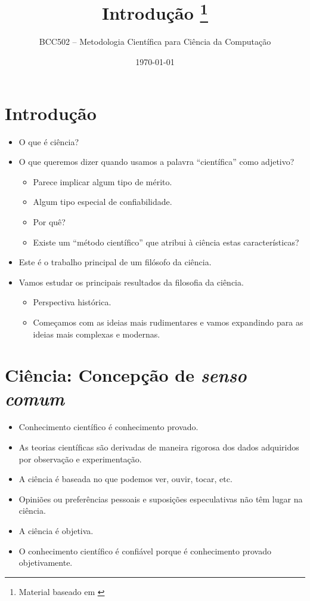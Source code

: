 \documentclass[9pt,a4paper]{extarticle}
\begin{document}
\title{Introdução \footnote{Material baseado em \citep{chalmers1993ciencia}}}
\author{BCC502 -- Metodologia Científica para Ciência da Computação}
\date{\today}
\maketitle

\tableofcontents

\section{Introdução}
\begin{itemize}
    \item O que é ciência?
    \item O que queremos dizer quando usamos a palavra ``científica'' como adjetivo?
    \begin{itemize}
        \item Parece implicar algum tipo de mérito.
        \item Algum tipo especial de confiabilidade.
        \item Por quê?
        \item Existe um ``método científico'' que atribui à ciência estas características? 
    \end{itemize}
    \item Este é o trabalho principal de um filósofo da ciência.
    \item Vamos estudar os principais resultados da filosofia da ciência.
    \begin{itemize}
        \item Perspectiva histórica.
        \item Começamos com as ideias mais rudimentares e vamos expandindo para as ideias mais complexas e modernas.
    \end{itemize}
\end{itemize}


\section{Ciência: Concepção de \textit{senso comum}}

\begin{itemize}
    \item Conhecimento científico é conhecimento provado. 
    \item As teorias científicas são derivadas de maneira rigorosa dos dados adquiridos por observação e experimentação.
    \item A ciência é baseada no que podemos ver, ouvir, tocar, etc.
    \item Opiniões ou preferências pessoais e suposições especulativas não têm lugar na ciência.
    \item A ciência é objetiva.
    \item O conhecimento científico é confiável porque é conhecimento provado objetivamente.
\end{itemize}
\end{document}
